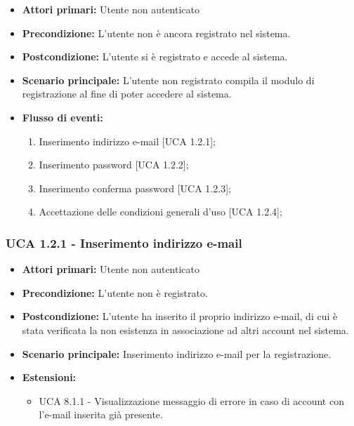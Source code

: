 \begin{itemize}
\item \textbf{Attori primari:} Utente non autenticato
\item \textbf{Precondizione:} L'utente non è ancora registrato nel sistema.
\item \textbf{Postcondizione:} L'utente si è registrato e accede al sistema.
\item \textbf{Scenario principale:} L'utente non registrato compila il modulo di registrazione al fine di poter accedere al sistema.
\item \textbf{Flusso di eventi:}
  \begin{enumerate}
        \item Inserimento indirizzo e-mail [UCA 1.2.1];
        \item Inserimento password [UCA 1.2.2];
        \item Inserimento conferma password [UCA 1.2.3];
        \item Accettazione delle condizioni generali d'uso [UCA 1.2.4];
    \end{enumerate}
\end{itemize}

\subsubsection{UCA 1.2.1 - Inserimento indirizzo e-mail}%

\begin{itemize}
\item \textbf{Attori primari:} Utente non autenticato
\item \textbf{Precondizione:} L'utente non è registrato.
\item \textbf{Postcondizione:} L'utente ha inserito il proprio indirizzo e-mail, di cui è stata verificata la non esistenza in associazione ad altri account nel sistema.
\item \textbf{Scenario principale:} Inserimento indirizzo e-mail per la registrazione.
\item \textbf{Estensioni:}
	\begin{itemize}
		\item UCA 8.1.1 - Visualizzazione messaggio di errore in caso di account con l'e-mail inserita già presente.
	\end{itemize}
\end{itemize}

